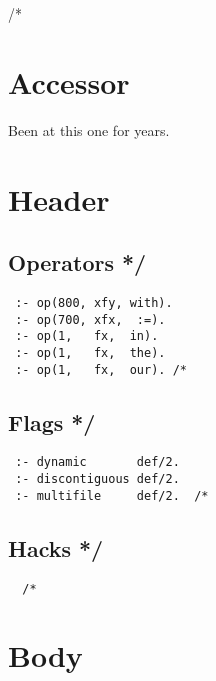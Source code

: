 \documentclass{article}
\begin{document}
\tableofcontents



/*


\section{Accessor\label{Accessor}}


Been at this one for years.

\section{Header\label{Header}}
\subsection*{Operators */\label{Operators_}}
\begin{verbatim}
 :- op(800, xfy, with).
 :- op(700, xfx,  :=).
 :- op(1,   fx,  in).
 :- op(1,   fx,  the).
 :- op(1,   fx,  our). /*
\end{verbatim}
\subsection*{Flags */\label{Flags_}}
\begin{verbatim}
 :- dynamic       def/2.
 :- discontiguous def/2.
 :- multifile     def/2.  /*
\end{verbatim}
\subsection*{Hacks */\label{Hacks_}}
\begin{verbatim}
  /*
\end{verbatim}
\section{Body\label{Body}}
\end{document}
